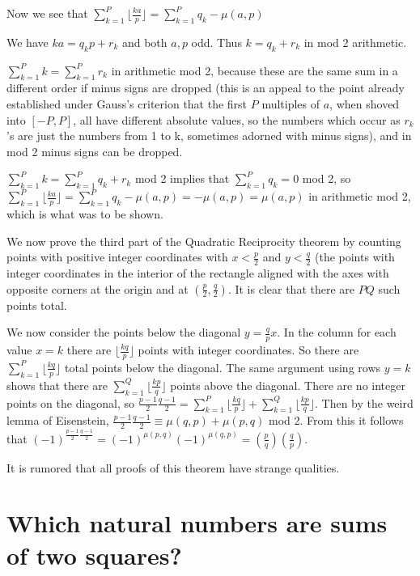 \documentclass[12pt]{article}
\begin{document}
Now we see that  $\sum_{k=1}^P\lfloor \frac{ka}p\rfloor = \sum_{k=1}^P q_k - \mu(a,p)$

We have $ka=q_kp+r_k$ and both $a,p$ odd.   Thus $k=q_k+r_k$ in mod 2 arithmetic.

$\sum_{k=1}^P k=\sum_{k=1}^P r_k$ in arithmetic mod 2, because these are the same sum in a different order if minus signs are dropped (this is an appeal to the point already established under Gauss's criterion that the first $P$ multiples of $a$, when shoved into $[-P,P]$, all have different absolute values, so the numbers which occur as $r_k$'s are just the numbers from 1 to k, sometimes adorned with minus signs), and in mod 2 minus signs can be dropped.

$\sum_{k=1}^P k = \sum_{k=1}^P q_k+r_k$ mod 2 implies that $\sum_{k=1}^P q_k = 0$ mod 2, so $\sum_{k=1}^P\lfloor \frac{ka}p\rfloor = \sum_{k=1}^P q_k - \mu(a,p) = -\mu(a,p)=\mu(a,p)$ in arithmetic mod 2, which is what was to be shown.


We now prove the third part of the Quadratic Reciprocity theorem by counting points with positive integer coordinates with $x<\frac p2$ and $y <\frac q2$ (the points with integer coordinates in the interior of the rectangle aligned with the axes
with opposite corners at the origin and at $(\frac p2, \frac q2)$.  It is clear that there are $PQ$ such points total.

We now consider the points below the diagonal $y = \frac qp x$.   In the column for each value $x=k$ there are $\lfloor \frac{kq}p \rfloor$ points with integer coordinates.   So there are $\sum_{k=1}^P\lfloor \frac{kq}p\rfloor$ total points below
the diagonal.   The same argument using rows $y=k$ shows that there are $\sum_{k=1}^Q\lfloor \frac{kp}q\rfloor$ points above the diagonal.  There are no integer points on the diagonal, so 
$\frac{p-1}2\frac{q-1}2 = \sum_{k=1}^P\lfloor \frac{kq}p\rfloor + \sum_{k=1}^Q\lfloor \frac{kp}q\rfloor$.  Then by the weird lemma of Eisenstein, $\frac{p-1}2\frac{q-1}2 \equiv \mu(q,p) + \mu(p,q)$ mod 2.  From this it follows that
$(-1)^{\frac{p-1}2\frac{q-1}2} = (-1)^{\mu(p,q)}(-1)^{\mu(q,p)} = \left(\frac pq\right)\left(\frac qp\right)$.

It is rumored that all proofs of this theorem have strange qualities.



\section{Which natural numbers are sums of two squares?}
\end{document}
